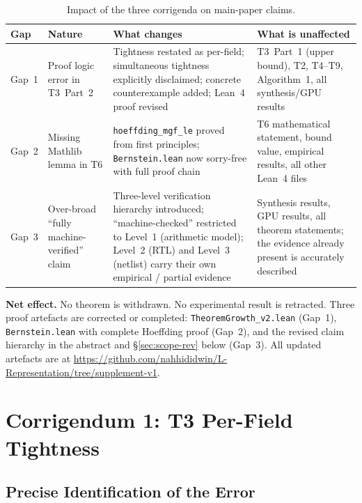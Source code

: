 \documentclass[11pt,a4paper]{article}
\theoremstyle{definition}
\theoremstyle{plain}
\theoremstyle{remark}
\begin{document}
\begin{table}[h]
\centering
\caption{Impact of the three corrigenda on main-paper claims.}
\label{tab:impact}
\small
\begin{tabular}{p{1.5cm}p{3.8cm}p{4.8cm}p{3.2cm}}
\toprule
Gap & Nature & What changes & What is unaffected \\
\midrule
Gap~1 & Proof logic error in T3~Part~2 &
  Tightness restated as per-field; simultaneous tightness explicitly
  disclaimed; concrete counterexample added; Lean~4 proof revised &
  T3~Part~1 (upper bound), T2, T4--T9, Algorithm~1, all
  synthesis/GPU results \\
\addlinespace
Gap~2 & Missing Mathlib lemma in T6 &
  \texttt{hoeffding\_mgf\_le} proved from first principles;
  \texttt{Bernstein.lean} now sorry-free with full proof chain &
  T6 mathematical statement, bound value, empirical results,
  all other Lean~4 files \\
\addlinespace
Gap~3 & Over-broad ``fully machine-verified'' claim &
  Three-level verification hierarchy introduced; ``machine-checked''
  restricted to Level~1 (arithmetic model); Level~2 (RTL) and
  Level~3 (netlist) carry their own empirical / partial evidence &
  Synthesis results, GPU results, all theorem statements;
  the evidence already present is accurately described \\
\bottomrule
\end{tabular}
\end{table}

\begin{corrbox}
\textbf{Net effect.}
No theorem is withdrawn.
No experimental result is retracted.
Three proof artefacts are corrected or completed:
\texttt{TheoremGrowth\_v2.lean} (Gap~1),
\texttt{Bernstein.lean} with complete Hoeffding proof (Gap~2),
and the revised claim hierarchy in the abstract and
\S\ref{sec:scope-rev} below (Gap~3).
All updated artefacts are at
\url{https://github.com/nahhididwin/L-Representation/tree/supplement-v1}.
\end{corrbox}

\section{Corrigendum 1: T3 Per-Field Tightness}
\label{sec:gap1}

\subsection{Precise Identification of the Error}
\label{sec:gap1-error}
\end{document}
